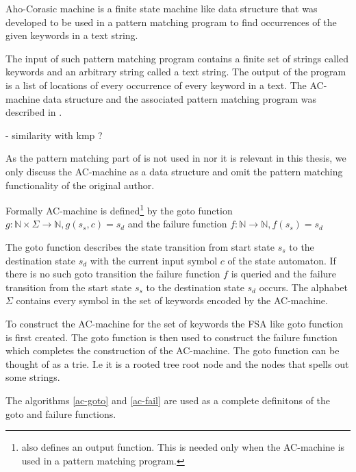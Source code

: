 \documentclass[english,twoside,censored,csm,algorithms-track-2020]{HYthesisML}
\theoremstyle{plain}
\theoremstyle{definition}
\begin{document}
  
  Aho-Corasic machine is a finite state machine like data structure that was developed to be used
  in a pattern matching program to find occurrences of the given keywords in a text string. \citep{aho75}

  The input of such pattern matching program contains a finite set of strings called keywords and an
  arbitrary string called a text string. The output of the program is a list of locations of every
  occurrence of every keyword in a text. The AC-machine data structure and the associated pattern
  matching program was described in \citep{aho75}.

  - similarity with kmp ?

  As the pattern matching part of \citep{aho75} is not used in \citep{ukkonen90} nor it is relevant in
  this thesis, we only discuss the AC-machine as a data structure and omit the pattern matching
  functionality of the original author.


  Formally AC-machine is defined\footnote{\citep{aho75} also defines an output function.
  This is needed only when the AC-machine is used in a pattern matching program.} by the goto function
  $g : \mathbb{N} \times \Sigma \rightarrow \mathbb{N}, g(s_s,c) = s_d$ and the failure function
  $f : \mathbb{N} \rightarrow \mathbb{N}, f(s_s) = s_d$

  The goto function describes the state transition from start state $s_s$ to the destination state
  $s_d$ with the current input symbol $c$ of the state automaton. If there is no such goto transition
  the failure function $f$ is queried and the failure transition from the start state $s_s$ to
  the destination state $s_d$ occurs. The alphabet $\Sigma$ contains every symbol in the set of
  keywords encoded by the AC-machine.

  To construct the AC-machine for the set of keywords the \textsc{FSA} like goto function is first
  created. The goto function is then used to construct the failure function which completes the
  construction of the AC-machine. The goto function can be thought of as a trie. 
  I.e it is a rooted tree 
  root node and the nodes that spells out some strings. 

  The algorithms \ref{ac-goto} and \ref{ac-fail} are used as a complete definitons of the goto and
  failure functions.
\end{document}
